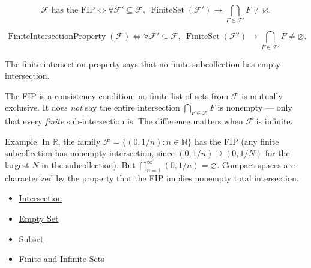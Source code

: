 \begin{remark*}
\[
  \mathcal{F}\text{ has the FIP}
  \iff
  \forall \mathcal{F}'\subseteq\mathcal{F},\
  \operatorname{FiniteSet}(\mathcal{F}')
  \to
  \bigcap_{F\in\mathcal{F}'}F\neq\varnothing.
\]
\end{remark*}

\begin{remark*}
\[
  \operatorname{FiniteIntersectionProperty}(\mathcal{F})
  \iff
  \forall \mathcal{F}'\subseteq\mathcal{F},\
  \operatorname{FiniteSet}(\mathcal{F}')
  \to
  \bigcap_{F\in\mathcal{F}'}F\neq\varnothing.
\]
\end{remark*}

\begin{remark*}[Interpretation]
The finite intersection property says that no finite subcollection has empty
intersection.
\end{remark*}


\begin{remark*}[Exposition]
The FIP is a consistency condition: no finite list of sets from $\mathcal{F}$
is mutually exclusive. It does \emph{not} say the entire intersection
$\bigcap_{F \in \mathcal{F}} F$ is nonempty --- only that every \emph{finite}
sub-intersection is. The difference matters when $\mathcal{F}$ is infinite.

Example: In $\mathbb{R}$, the family $\mathcal{F} = \{(0, 1/n) : n \in
\mathbb{N}\}$ has the FIP (any finite subcollection has nonempty intersection,
since $(0, 1/n) \supseteq (0, 1/N)$ for the largest $N$ in the subcollection).
But $\bigcap_{n=1}^\infty (0,1/n) = \varnothing$. Compact spaces are
characterized by the property that the FIP implies nonempty total
intersection.
\end{remark*}

\begin{dependencies}
\begin{itemize}
  \item \hyperref[def:intersection]{Intersection}
  \item \hyperref[def:empty-set]{Empty Set}
  \item \hyperref[def:subset]{Subset}
  \item \hyperref[def:finite-infinite]{Finite and Infinite Sets}
\end{itemize}
\end{dependencies}

